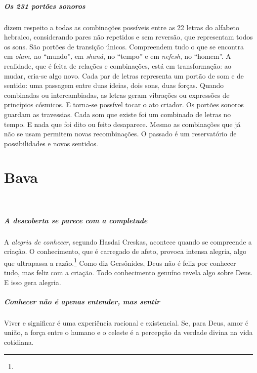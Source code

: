 \paragraph{Os 231 portões sonoros} dizem respeito a todas as combinações possíveis entre as 22 letras do alfabeto hebraico, considerando pares não repetidos e sem reversão, que representam todos os sons. São portões de transição únicos. Compreendem tudo o que se encontra em \textit{olam}, no ``mundo'', em \textit{shaná}, no ``tempo'' e em \textit{nefesh}, no ``homem''. A realidade, que é feita de relações e combinações, está em transformação: ao mudar, cria-se algo novo. Cada par de letras representa um portão de som e de sentido: uma passagem entre duas ideias, dois sons, duas forças. Quando combinadas ou intercambiadas, as letras geram vibrações ou expressões de princípios cósmicos. E torna-se possível tocar o ato criador. Os portões sonoros guardam as travessias. Cada som que existe foi um combinado de letras no tempo. E nada que foi dito ou feito desaparece. Mesmo as combinações que já não se usam permitem novas recombinações. O passado é um reservatório de possibilidades e novos sentidos.

\chapter*{Bava 
\smallskip{}}

\begin{center}
{\huge{}}\\\medskip{\footnotesize\formularlight{
\lipsum[2]
}}
\end{center}

\paragraph{A descoberta se parece com a completude} A \textit{alegria de conhecer}, segundo Hasdai Creskas, acontece quando se compreende a criação. O conhecimento, que é carregado de afeto, provoca intensa alegria, algo que ultrapassa a razão.\footnote{} Como diz Gersônides, Deus não é feliz por conhecer tudo, mas feliz com a criação. Todo conhecimento genuíno revela algo sobre Deus. E isso gera alegria.

\paragraph{Conhecer não é apenas entender, mas sentir} Viver e significar é uma experiência racional e existencial. Se, para Deus, amor é união, a força entre o humano e o celeste é a percepção da verdade divina na vida cotidiana.

